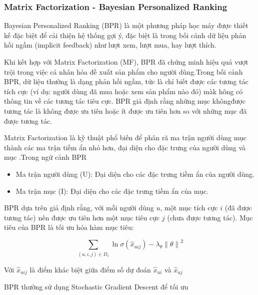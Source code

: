 \subsubsection{Matrix Factorization - Bayesian Personalized Ranking}


Bayesian Personalized Ranking (BPR) là một phương pháp học máy được thiết kế đặc
biệt để cải thiện hệ thống gợi ý, đặc biệt là trong bối cảnh dữ liệu phản hồi
ngầm (implicit feedback) như lượt xem, lượt mua, hay lượt thích.

Khi kết hợp với Matrix Factorization (MF), BPR đã chứng minh hiệu quả vượt trội
trong việc cá nhân hóa đề xuất sản phẩm cho người dùng.Trong bối cảnh BPR, dữ
liệu thường là dạng phản hồi ngầm, tức là chỉ biết được các tương tác tích cực
(ví dụ: người dùng đã mua hoặc xem sản phẩm nào đó) màk hông có thông tin về
các tương tác tiêu cực. BPR giả định rằng những mục khôngđược tương tác là
không được ưu tiên hoặc ít được ưu tiên hơn so với những mục đã được tương tác.

Matrix Factorization là kỹ thuật phổ biến để phân rã ma trận người dùng mục
thành các ma trận tiềm ẩn nhỏ hơn, đại diện cho đặc trưng của người dùng và mục
.Trong ngữ cảnh BPR\:
\begin{itemize}
    \item Ma trận người dùng (U): Đại diện cho các đặc trưng tiềm ẩn của người dùng.
    \item Ma trận mục (I): Đại diện cho các đặc trưng tiềm ẩn của mục.
\end{itemize}

BPR dựa trên giả định rằng, với mỗi người dùng $ u $, một mục tích cực $ i $ (đã được
tương tác) nên được ưu tiên hơn một mục tiêu cực $ j $ (chưa được tương tác). Mục
tiêu của BPR là tối ưu hóa hàm mục tiêu:

\[
    \sum_{ (u, i, j) \in D_s} \ln{\sigma (\hat x_{uij}) - \lambda_\theta {\| \theta \|}^2 }
\]

Với $ \hat x_{uij} $ là điểm khác biệt giữa điểm số dự đoán $ \hat x_{ui} $ và
$ \hat x_{uj} $

BPR thường sử dụng Stochastic Gradient Descent để tối ưu

